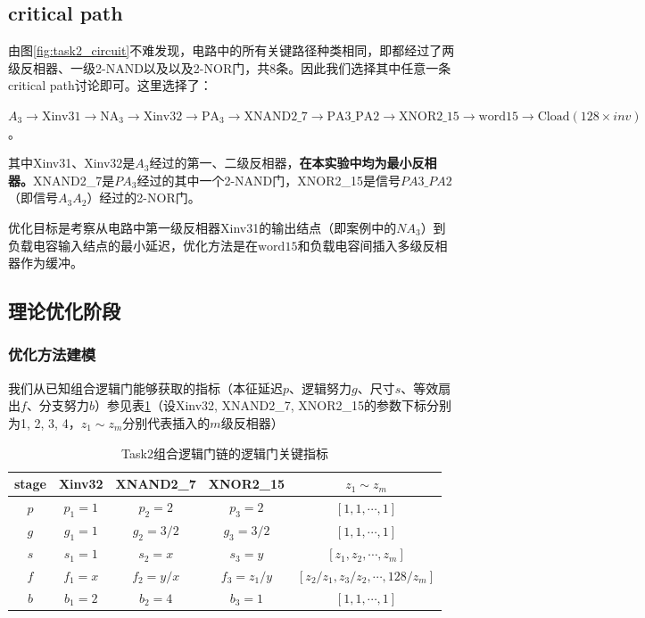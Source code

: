 \documentclass[UTF8,12pt,a4paper]{ctexart}
\begin{document}
\subsection{critical path}

由图\ref{fig:task2_circuit}不难发现，电路中的所有关键路径种类相同，即都经过了两级反相器、一级2-NAND以及以及2-NOR门，共8条。因此我们选择其中任意一条critical path讨论即可。这里选择了：

$A_3 \rightarrow \text{Xinv31} \rightarrow \text{NA}_3 \rightarrow \text{Xinv32} \rightarrow \text{PA}_3 \rightarrow \text{XNAND2\_7} \rightarrow \text{PA3\_PA2} \rightarrow \text{XNOR2\_15} \rightarrow \text{word}15 \rightarrow \text{Cload}(128\times{inv})$。

其中Xinv31、Xinv32是$A_3$经过的第一、二级反相器，\textbf{在本实验中均为最小反相器。}XNAND2\_7是$PA_3$经过的其中一个2-NAND门，XNOR2\_15是信号$PA3\_PA2$（即信号$A_{3}A_{2}$）经过的2-NOR门。

优化目标是考察从电路中第一级反相器Xinv31的输出结点（即案例中的$NA_3$）到负载电容输入结点的最小延迟，优化方法是在$\text{word}15$和负载电容间插入多级反相器作为缓冲。

\subsection{理论优化阶段}

\subsubsection{优化方法建模}

我们从已知组合逻辑门能够获取的指标（本征延迟$p$、逻辑努力$g$、尺寸$s$、等效扇出$f$、分支努力$b$）参见表\ref{tab:task2_metrics}（设Xinv32, XNAND2\_7, XNOR2\_15的参数下标分别为1, 2, 3, 4，$z_1 \sim z_m$分别代表插入的$m$级反相器）

\begin{table}[htbp]
    \centering
    \caption{Task2组合逻辑门链的逻辑门关键指标}
    \label{tab:task2_metrics}
    \begin{tabular}{ccccc}
    \toprule
    stage & Xinv32 & XNAND2\_7 & XNOR2\_15 & $z_1 \sim z_m$ \\
    \midrule
    $p$ & $p_1 = 1$ & $p_2 = 2$ & $p_3 = 2$ & $[1,1,\cdots ,1]$ \\
    $g$ & $g_1 = 1$ & $g_2 = 3/2$ & $g_3 = 3/2$ & $[1,1,\cdots ,1]$ \\
    $s$ & $s_1 = 1$ & $s_2 = x$ & $s_3 = y$ & $[z_1, z_2, \cdots, z_m]$ \\
    $f$ & $f_1 = x$ & $f_2 = y/x$ & $f_3 = z_{1}/y$ & $[z_{2}/z_{1}, z_{3}/z_{2}, \cdots, 128/z_{m}]$ \\
    $b$ & $b_1 = 2$ & $b_2 = 4$ & $b_3 = 1$ & $[1,1,\cdots ,1]$ \\
    \bottomrule
    \end{tabular}
\end{table}
\end{document}
